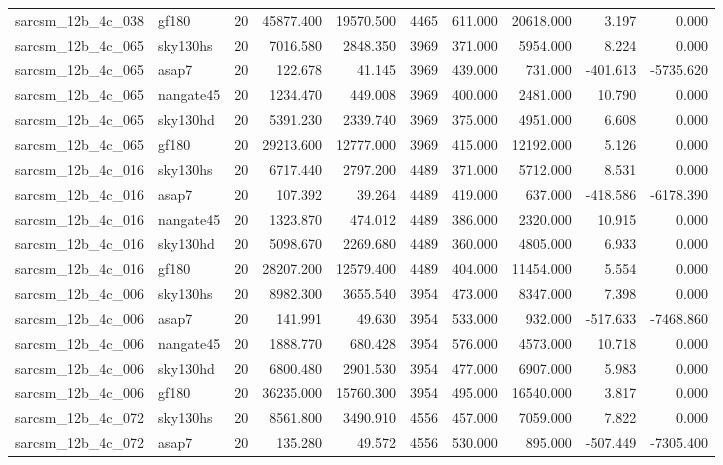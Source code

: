 \documentclass{article}
\begin{document}
\begin{longtable}{llrrrrrrrr}
sarcsm\_12b\_4c\_038 & gf180 & 20 & 45877.400 & 19570.500 & 4465 & 611.000 & 20618.000 & 3.197 & 0.000 \\
sarcsm\_12b\_4c\_065 & sky130hs & 20 & 7016.580 & 2848.350 & 3969 & 371.000 & 5954.000 & 8.224 & 0.000 \\
sarcsm\_12b\_4c\_065 & asap7 & 20 & 122.678 & 41.145 & 3969 & 439.000 & 731.000 & -401.613 & -5735.620 \\
sarcsm\_12b\_4c\_065 & nangate45 & 20 & 1234.470 & 449.008 & 3969 & 400.000 & 2481.000 & 10.790 & 0.000 \\
sarcsm\_12b\_4c\_065 & sky130hd & 20 & 5391.230 & 2339.740 & 3969 & 375.000 & 4951.000 & 6.608 & 0.000 \\
sarcsm\_12b\_4c\_065 & gf180 & 20 & 29213.600 & 12777.000 & 3969 & 415.000 & 12192.000 & 5.126 & 0.000 \\
sarcsm\_12b\_4c\_016 & sky130hs & 20 & 6717.440 & 2797.200 & 4489 & 371.000 & 5712.000 & 8.531 & 0.000 \\
sarcsm\_12b\_4c\_016 & asap7 & 20 & 107.392 & 39.264 & 4489 & 419.000 & 637.000 & -418.586 & -6178.390 \\
sarcsm\_12b\_4c\_016 & nangate45 & 20 & 1323.870 & 474.012 & 4489 & 386.000 & 2320.000 & 10.915 & 0.000 \\
sarcsm\_12b\_4c\_016 & sky130hd & 20 & 5098.670 & 2269.680 & 4489 & 360.000 & 4805.000 & 6.933 & 0.000 \\
sarcsm\_12b\_4c\_016 & gf180 & 20 & 28207.200 & 12579.400 & 4489 & 404.000 & 11454.000 & 5.554 & 0.000 \\
sarcsm\_12b\_4c\_006 & sky130hs & 20 & 8982.300 & 3655.540 & 3954 & 473.000 & 8347.000 & 7.398 & 0.000 \\
sarcsm\_12b\_4c\_006 & asap7 & 20 & 141.991 & 49.630 & 3954 & 533.000 & 932.000 & -517.633 & -7468.860 \\
sarcsm\_12b\_4c\_006 & nangate45 & 20 & 1888.770 & 680.428 & 3954 & 576.000 & 4573.000 & 10.718 & 0.000 \\
sarcsm\_12b\_4c\_006 & sky130hd & 20 & 6800.480 & 2901.530 & 3954 & 477.000 & 6907.000 & 5.983 & 0.000 \\
sarcsm\_12b\_4c\_006 & gf180 & 20 & 36235.000 & 15760.300 & 3954 & 495.000 & 16540.000 & 3.817 & 0.000 \\
sarcsm\_12b\_4c\_072 & sky130hs & 20 & 8561.800 & 3490.910 & 4556 & 457.000 & 7059.000 & 7.822 & 0.000 \\
sarcsm\_12b\_4c\_072 & asap7 & 20 & 135.280 & 49.572 & 4556 & 530.000 & 895.000 & -507.449 & -7305.400 \\

\end{longtable}
\end{document}
